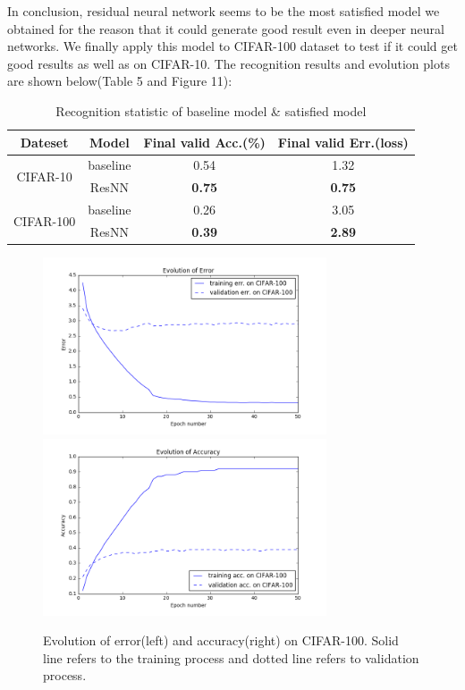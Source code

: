 \documentclass[]{article}
\begin{document}
In conclusion, residual neural network seems to be the most satisfied model we obtained for the reason that it could generate good result even in deeper neural networks. We finally apply this model to CIFAR-100 dataset to test if it could get good results as well as on CIFAR-10. The recognition results and evolution plots are shown below(Table 5 and Figure 11):

\begin{table}[ht]
\centering 
\caption{Recognition statistic of baseline model \& satisfied model}
\begin{tabular}{c c c c}
\toprule
Dateset & Model & Final valid Acc.(\%) & Final valid Err.(loss)\\
\midrule
\multirow{2}{*}{CIFAR-10} & baseline & 0.54 & 1.32 \\
 & ResNN & \textbf{0.75} & \textbf{0.75}  \\
\midrule
\multirow{2}{*}{CIFAR-100} & baseline & 0.26 & 3.05   \\
 & ResNN & \textbf{0.39} & \textbf{2.89}   \\
\bottomrule
\end{tabular}
\end{table} 

\begin{figure}[!h]
\begin{center}
\includegraphics[width = 3.3in]{cifar100_err}
\includegraphics[width = 3.3in]{cifar100_acc}
\caption{Evolution of error(left) and accuracy(right) on CIFAR-100. Solid line refers to the training process and dotted line refers to validation process.}
\end{center}
\end{figure}
\end{document}
